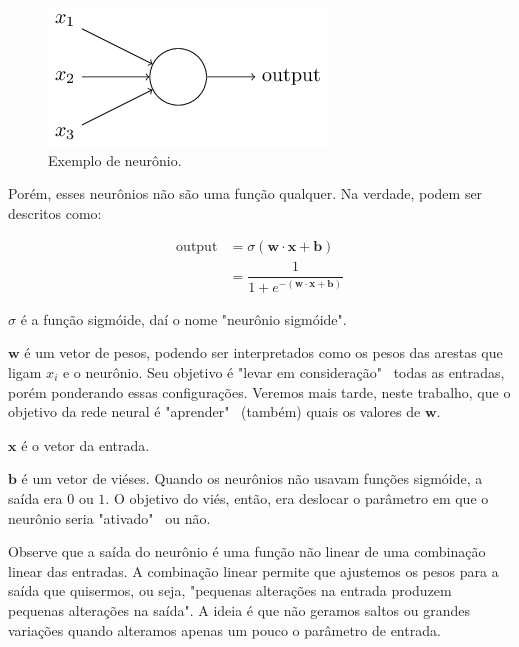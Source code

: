 \documentclass{article}
\begin{document}
            \begin{figure}[h!]
                \centering
                \includegraphics[scale=0.5]{Images/Sigmoid neuron.png}
                \caption{Exemplo de neurônio.}
                \label{fig2}
            \end{figure}
            
            Porém, esses neurônios não são uma função qualquer. Na verdade, podem ser descritos como:

            \begin{equation}
                \begin{split}
                    \textrm{output} &= \sigma(\mathbf{w} \cdot \mathbf{x} + \mathbf{b}) \\
                                    &= \dfrac{1}{1 + e^{-(\mathbf{w} \cdot \mathbf{x} + \mathbf{b})}}
                \end{split}
            \end{equation}

            $\sigma$ é a função sigmóide, daí o nome "neurônio sigmóide".

            $\mathbf{w}$ é um vetor de pesos, podendo ser interpretados como os pesos das arestas que ligam $x_i$ e o neurônio.
            Seu objetivo é "levar em consideração" \ todas as entradas, porém ponderando essas configurações.
            Veremos mais tarde, neste trabalho, que o objetivo da rede neural é "aprender" \ (também) quais os valores de $\mathbf{w}$.

            $\mathbf{x}$ é o vetor da entrada.
            
            $\mathbf{b}$ é um vetor de viéses.
            Quando os neurônios não usavam funções sigmóide, a saída era $0$ ou $1$.
            O objetivo do viés, então, era deslocar o parâmetro em que o neurônio seria "ativado" \ ou não.

            Observe que a saída do neurônio é uma função não linear de uma combinação linear das entradas.
            A combinação linear permite que ajustemos os pesos para a saída que quisermos, ou seja, "pequenas alterações na entrada produzem pequenas alterações na saída".
            A ideia é que não geramos saltos ou grandes variações quando alteramos apenas um pouco o parâmetro de entrada.
            
\end{document}
